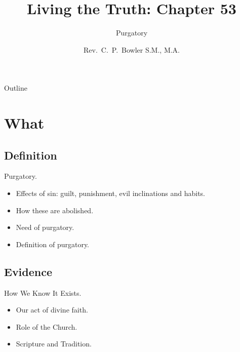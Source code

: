 \documentclass{beamer}
\title[Living the Truth 53] %
{Living the Truth: Chapter 53}
\subtitle
{Purgatory} %
\author{Rev.~C.~P.~Bowler S.M., M.A.}
\begin{document}
\begin{frame}
  \titlepage
\end{frame}

\begin{frame}{Outline}
  \tableofcontents
\end{frame}





\section{What}

\subsection{Definition}

\begin{frame}{Purgatory.}
\begin{itemize}
 \item Effects of sin: guilt, punishment, evil inclinations and habits.
 \item How these are abolished.
 \item Need of purgatory.
 \item Definition of purgatory.
\end{itemize}
\end{frame}

\subsection{Evidence}

\begin{frame}{How We Know It Exists.}
\begin{itemize}
 \item Our act of divine faith.
 \item Role of the Church.
 \item Scripture and Tradition.
\end{itemize}
\end{frame}
\end{document}
